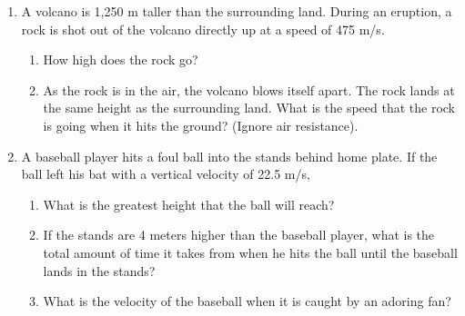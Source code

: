 \documentclass[letterpaper, 12pt]{article}
\begin{document}
\begin{enumerate}
	\item A volcano is 1,250 m taller than the surrounding land.  During an eruption, a rock is shot out of the volcano directly up at a speed of 475 m/s.  
	\begin{enumerate}
		\item How high does the rock go?
		\vspace{1in}
		\item As the rock is in the air, the volcano blows itself apart.  The rock lands at the same height as the surrounding land.  What is the speed that the rock is going when it hits the ground? (Ignore air resistance).
		\vspace{1in}
	\end{enumerate}
	\item A baseball player hits a foul ball into the stands behind home plate.  If the ball left his bat with a vertical velocity of 22.5 m/s, 
	
		\begin{enumerate}
		\item What is the greatest height that the ball will reach?
		\vspace{1in}
		\item If the stands are 4 meters higher than the baseball player, what is the total amount of time it takes from when he hits the ball until the baseball lands in the stands?
		\vspace{1in}
		\item What is the velocity of the baseball when it is caught by an adoring fan?
	\end{enumerate}

\end{enumerate}
 
\end{document}
